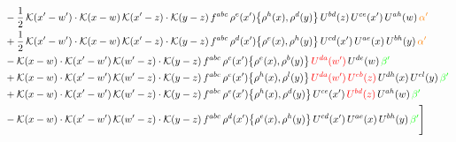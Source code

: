 \documentclass[9pt]{article}
\numberwithin{equation}{section}
\begin{document}
\begin{align}
&-\frac{1}{2}\,\mathcal{K}(x'-w')\cdot\mathcal{K}(x-w)\,\mathcal{K}(x'-z)\cdot\mathcal{K}(y-z)\, f^{abc}\,\rho^{e}(x')\big\{\rho^{h}(x),\rho^{d}(y)\big\}\,U^{bd}(z)\,U^{ce}(x')\,U^{ah}(w)\,{\color{orange}\alpha'}\notag \\ & +\frac{1}{2}\,\mathcal{K}(x'-w')\cdot\mathcal{K}(x-w)\,\mathcal{K}(x'-z)\cdot\mathcal{K}(y-z)\, f^{abc}\,\rho^{d}(x')\big\{\rho^{e}(x),\rho^{h}(y)\big\}\,U^{cd}(x')\,U^{ae}(x)\,U^{bh}(y)\,{\color{orange}\alpha'}\notag \\ & -\mathcal{K}(x-w)\cdot\mathcal{K}(x'-w')\,\mathcal{K}(w'-z)\cdot\mathcal{K}(y-z)\, f^{abc}\,\rho^{c}(x')\big\{\rho^{e}(x),\rho^{b}(y)\big\}\,{\color{red}U^{da}(w')}\,U^{de}(w)\,{\color{green}\beta'}\notag \\ & +\mathcal{K}(x-w)\cdot\mathcal{K}(x'-w')\,\mathcal{K}(w'-z)\cdot\mathcal{K}(y-z)\, f^{abc}\,\rho^{c}(x')\big\{\rho^{h}(x),\rho^{l}(y)\big\}\,{\color{red}U^{da}(w')}\,{\color{red}U^{eb}(z)}\,U^{dh}(x)\,U^{el}(y)\,{\color{green}\beta'}\notag\\ &+\mathcal{K}(x-w)\cdot\mathcal{K}(x'-w')\,\mathcal{K}(w'-z)\cdot\mathcal{K}(y-z)\, f^{abc}\,\rho^{e}(x')\big\{\rho^{h}(x),\rho^{d}(y)\big\}\,U^{ce}(x')\,{\color{red}U^{bd}(z)}\,U^{ah}(w)\,{\color{green}\beta'}\notag \\ &-\mathcal{K}(x-w)\cdot\mathcal{K}(x'-w')\,\mathcal{K}(w'-z)\cdot\mathcal{K}(y-z)\, f^{abc}\,\rho^{d}(x')\big\{\rho^{e}(x),\rho^{h}(y)\big\}\,U^{cd}(x')\,U^{ae}(x)\,U^{bh}(y)\,{\color{green}\beta'}\Bigg]
\end{align}
\end{document}
